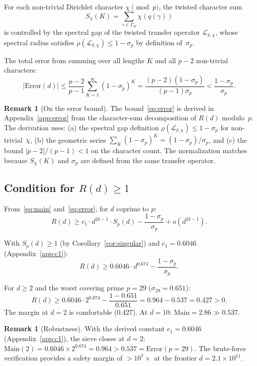\documentclass[11pt,a4paper]{amsart}
\theoremstyle{definition}
\newtheorem{remark}[theorem]{Remark}
\begin{document}
For each non-trivial Dirichlet character $\chi \pmod{p}$, the twisted character sum
\[
S_\chi(K) = \sum_{\gamma \in \Gamma_K} \chi(q(\gamma))
\]
is controlled by the spectral gap of the twisted transfer operator $\mathcal{L}_{\delta,\chi}$, whose spectral radius satisfies $\rho(\mathcal{L}_{\delta,\chi}) \leq 1 - \sigma_p$ by definition of~$\sigma_p$.

The total error from summing over all lengths $K$ and all $p-2$ non-trivial characters:
\begin{equation}\label{eq:error}
|\text{Error}(d)| \leq \frac{p-2}{p-1} \sum_{K=1}^{\infty} (1-\sigma_p)^K = \frac{(p-2)(1-\sigma_p)}{(p-1)\sigma_p} < \frac{1-\sigma_p}{\sigma_p}.
\end{equation}

\begin{remark}[On the error bound]\label{rem:error}
The bound~\eqref{eq:error} is derived in Appendix~\ref{app:error} from the character-sum decomposition of $R(d)$ modulo~$p$. The derivation uses: (a) the spectral gap definition $\rho(\mathcal{L}_{\delta,\chi}) \leq 1 - \sigma_p$ for non-trivial~$\chi$, (b) the geometric series $\sum_K (1-\sigma_p)^K = (1-\sigma_p)/\sigma_p$, and (c) the bound $|p-2|/(p-1) < 1$ on the character count. The normalization matches because $S_\chi(K)$ and $\sigma_p$ are defined from the same transfer operator.
\end{remark}

\subsection{Condition for $R(d) \geq 1$}

From~\eqref{eq:main} and~\eqref{eq:error}, for $d$ coprime to $p$:
\begin{equation}\label{eq:condition}
R(d) \geq c_1 \cdot d^{2\delta-1} \cdot S_p(d) - \frac{1-\sigma_p}{\sigma_p} + o(d^{2\delta-1}).
\end{equation}

With $S_p(d) \geq 1$ (by Corollary~\ref{cor:singular}) and $c_1 = 0.6046$ (Appendix~\ref{app:c1}):
\[
R(d) \geq 0.6046 \cdot d^{0.674} - \frac{1-\sigma_p}{\sigma_p}.
\]

For $d \geq 2$ and the worst covering prime $p=29$ ($\sigma_{29} = 0.651$):
\[
R(d) \geq 0.6046 \cdot 2^{0.674} - \frac{1-0.651}{0.651} = 0.964 - 0.537 = 0.427 > 0.
\]
The margin at $d = 2$ is comfortable (0.427). At $d = 10$: $\text{Main} = 2.86 \gg 0.537$.

\begin{remark}[Robustness]
With the derived constant $c_1 = 0.6046$ (Appendix~\ref{app:c1}), the sieve closes at $d = 2$: $\text{Main}(2) = 0.6046 \times 2^{0.674} = 0.964 > 0.537 = \text{Error}(p=29)$. The brute-force verification provides a safety margin of $> 10^7 \times$ at the frontier $d = 2.1 \times 10^{11}$.
\end{remark}
\end{document}

